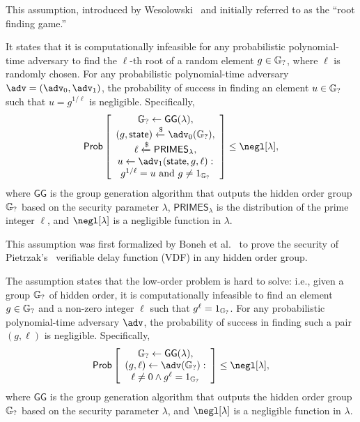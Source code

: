 \documentclass{iacrcc}
\begin{document}
This assumption, introduced by Wesolowski~\cite{JC:Wesolowski20} and initially referred to as the ``root finding game.''

\begin{definition}
It states that it is computationally infeasible for any probabilistic polynomial-time adversary to find the $\ell$-th root of a random element $g \in \mathbb{G}_{?}$, where $\ell$ is randomly chosen. For any probabilistic polynomial-time adversary $\adv = (\adv_0, \adv_1)$, the probability of success in finding an element $u \in \mathbb{G}_{?}$ such that $u = g^{1/\ell}$ is negligible. Specifically,
\[
\Pr
\left[
\begin{array}{c}
\hidgrp \leftarrow \mathsf{GG}(\lambda),             \\
(g, \mathsf{state}) \xleftarrow{\$} \adv_0(\hidgrp), \\
\ell \xleftarrow{\$} \mathsf{PRIMES}_{\lambda},           \\
u \leftarrow \adv_1(\mathsf{state}, g, \ell) :       \\
g^{1/\ell} = u \ \text{and} \ g \ne 1_{\hidgrp}
\end{array}
\right] \leq \negl[\lambda],
\]
where $\mathsf{GG}$ is the group generation algorithm that outputs the hidden order group $\mathbb{G}_{?}$ based on the security parameter $\lambda$, $\mathsf{PRIMES}_{\lambda}$ is the distribution of the prime integer $\ell$, and $\negl[\lambda]$ is a negligible function in $\lambda$.
\end{definition}

This assumption was first formalized by Boneh et al.~\cite{C:BonBunFis19} to prove the security of Pietrzak’s~\cite{ITCS:Pietrzak19b} verifiable delay function (VDF) in any hidden order group.

\begin{definition}
The assumption states that the low-order problem is hard to solve: i.e., given a group $\mathbb{G}_{?}$ of hidden order, it is computationally infeasible to find an element $g \in \mathbb{G}_{?}$ and a non-zero integer $\ell$ such that $g^{\ell} = 1_{\mathbb{G}_{?}}$. For any probabilistic polynomial-time adversary $\adv$, the probability of success in finding such a pair $(g, \ell)$ is negligible. Specifically,
\[
\Pr
\left[
\begin{array}{c}
\hidgrp \leftarrow \mathsf{GG}(\lambda), \\
(g, \ell) \leftarrow \adv(\hidgrp) :     \\
\ell \ne 0 \wedge g^{\ell} = 1_{\hidgrp}
\end{array}
\right] \leq \negl[\lambda],
\]
where $\mathsf{GG}$ is the group generation algorithm that outputs the hidden order group $\mathbb{G}_{?}$ based on the security parameter $\lambda$, and $\negl[\lambda]$ is a negligible function in $\lambda$.
\end{definition}
\end{document}
